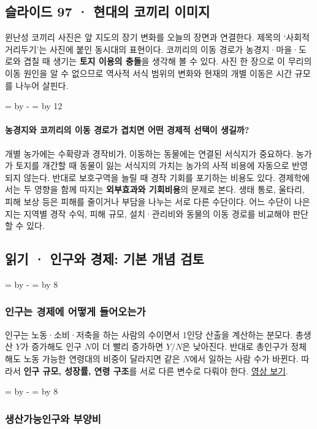 \documentclass[10pt,a4paper]{article}
\newcommand{\ReserveQuestionSpace}{%
  \par\begingroup
  \dimen0=\pagegoal \advance\dimen0 by -\pagetotal
  \dimen2=\baselineskip \multiply\dimen2 by 12
  \ifdim\dimen0<\dimen2 \newpage\fi
  \endgroup}
\newcommand{\ReserveReadingSectionSpace}{%
  \par\begingroup
  \dimen0=\pagegoal \advance\dimen0 by -\pagetotal
  \dimen2=\baselineskip \multiply\dimen2 by 8
  \ifdim\dimen0<\dimen2 \newpage\fi
  \endgroup}
\begin{document}
\subsection{슬라이드 97 · 현대의 코끼리 이미지}
윈난성 코끼리 사진은 앞 지도의 장기 변화를 오늘의 장면과 연결한다. 제목의 ‘사회적 거리두기’는 사진에 붙인 동시대의 표현이다. 코끼리의 이동 경로가 농경지·마을·도로와 겹칠 때 생기는 \textbf{토지 이용의 충돌}을 생각해 볼 수 있다. 사진 한 장으로 이 무리의 이동 원인을 알 수 없으므로 역사적 서식 범위의 변화와 현재의 개별 이동은 시간 규모를 나누어 살핀다.\par

\ReserveQuestionSpace
\paragraph{농경지와 코끼리의 이동 경로가 겹치면 어떤 경제적 선택이 생길까?}

개별 농가에는 수확량과 경작비가, 이동하는 동물에는 연결된 서식지가 중요하다. 농가가 토지를 개간할 때 동물이 잃는 서식지의 가치는 농가의 사적 비용에 자동으로 반영되지 않는다. 반대로 보호구역을 늘릴 때 경작 기회를 포기하는 비용도 있다. 경제학에서는 두 영향을 함께 따지는 \textbf{외부효과와 기회비용}의 문제로 본다. 생태 통로, 울타리, 피해 보상 등은 피해를 줄이거나 부담을 나누는 서로 다른 수단이다. 어느 수단이 나은지는 지역별 경작 수익, 피해 규모, 설치·관리비와 동물의 이동 경로를 비교해야 판단할 수 있다.\par

\clearpage{}
{}
\subsection*{읽기 · 인구와 경제: 기본 개념 검토}
\ReserveReadingSectionSpace
\subsubsection*{인구는 경제에 어떻게 들어오는가}

인구는 노동·소비·저축을 하는 사람의 수이면서 1인당 산출을 계산하는 분모다. 총생산 $Y$가 증가해도 인구 $N$이 더 빨리 증가하면 $Y/N$은 낮아진다. 반대로 총인구가 정체해도 노동 가능한 연령대의 비중이 달라지면 같은 $N$에서 일하는 사람 수가 바뀐다. 따라서 \textbf{인구 규모, 성장률, 연령 구조}를 서로 다른 변수로 다뤄야 한다. \href{https://youtu.be/luHh0S9SlH4}{영상 보기}.\par

\ReserveReadingSectionSpace
\subsubsection*{생산가능인구와 부양비}
\end{document}
